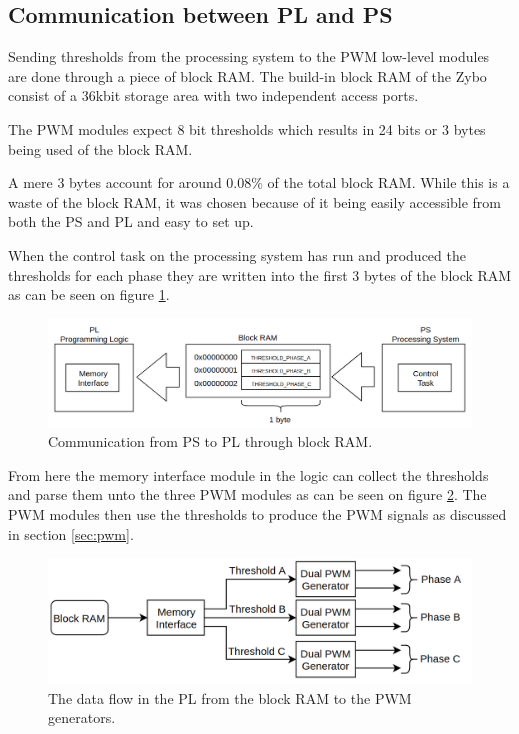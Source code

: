 \subsection{Communication between PL and PS}
Sending thresholds from the processing system to the PWM low-level modules are done through a piece of block RAM.
The build-in block RAM of the Zybo consist of a 36kbit storage area with two independent access ports. 

The PWM modules expect 8 bit thresholds which results in 24 bits or 3 bytes being used of the block RAM. 

A mere 3 bytes account for around $0.08\%$ of the total block RAM. While this is a waste of the block RAM, it was chosen because of it being easily accessible from both the PS and PL and easy to set up. 

When the control task on the processing system has run and produced the thresholds for each phase they are written into the first 3 bytes of the block RAM as can be seen on figure \ref{fig:com_pl_to_ps}.

\begin{figure}[H]
	\centering
	\includegraphics[width=1\linewidth]{pictures/software/com_pl_to_ps.png}
	\caption{Communication from PS to PL through block RAM.}
	\label{fig:com_pl_to_ps}
\end{figure}

From here the memory interface module in the logic can collect the thresholds and parse them unto the three PWM modules as can be seen on figure \ref{fig:com_pl}. The PWM modules then use the thresholds to produce the PWM signals as discussed in section \ref{sec:pwm}.


\begin{figure}[H]
	\centering
	\includegraphics[width=0.8\linewidth]{pictures/software/com_pl.png}
	\caption{The data flow in the PL from the block RAM to the PWM generators.}
	\label{fig:com_pl}
\end{figure}


